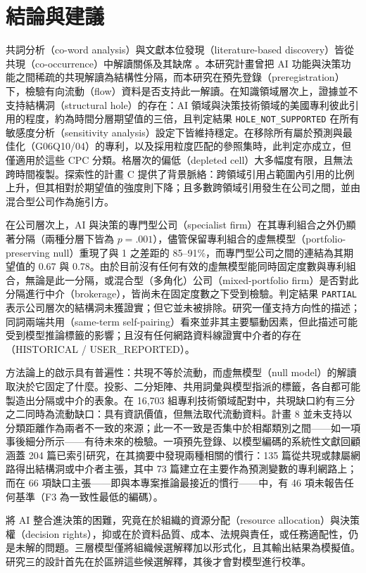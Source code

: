
\chapter{結論與建議}
\label{zh:sec:conclusion}

共詞分析（co-word analysis）與文獻本位發現（literature-based discovery）皆從共現（co-occurrence）中解讀關係及其缺席 \citep{callon1983translations,swanson1986fish}。本研究計畫曾把 AI 功能與決策功能之間稀疏的共現解讀為結構性分隔，而本研究在預先登錄（preregistration）下，檢驗有向流動（flow）資料是否支持此一解讀。在知識領域層次上，證據並不支持結構洞（structural hole）的存在：AI 領域與決策技術領域的美國專利彼此引用的程度，約為時間分層期望值的三倍，且判定結果 \texttt{HOLE\_\allowbreak NOT\_\allowbreak SUPPORTED} 在所有敏感度分析（sensitivity analysis）設定下皆維持穩定。在移除所有屬於預測與最佳化（G06Q10/04）的專利，以及採用粒度匹配的參照集時，此判定亦成立，但僅適用於這些 CPC 分類。格層次的偏低（depleted cell）大多幅度有限，且無法跨時間複製。探索性的計畫 C 提供了背景脈絡：跨領域引用占範圍內引用的比例上升，但其相對於期望值的強度則下降；且多數跨領域引用發生在公司之間，並由混合型公司作為施引方。

在公司層次上，AI 與決策的專門型公司（specialist firm）在其專利組合之外仍顯著分隔（兩種分層下皆為 $p=.001$），儘管保留專利組合的虛無模型（portfolio-preserving null）重現了與 1 之差距的 85--91\%，而專門型公司之間的連結為其期望值的 0.67 與 0.78。由於目前沒有任何有效的虛無模型能同時固定度數與專利組合，無論是此一分隔，或混合型（多角化）公司（mixed-portfolio firm）是否對此分隔進行中介（brokerage），皆尚未在固定度數之下受到檢驗。判定結果 \texttt{PARTIAL} 表示公司層次的結構洞未獲證實；但它並未被排除。研究一僅支持方向性的描述；同詞兩端共用（same-term self-pairing）看來並非其主要驅動因素，但此描述可能受到模型推論標籤的影響；且沒有任何網路資料線證實中介者的存在（HISTORICAL / USER\_REPORTED）。

方法論上的啟示具有普遍性：共現不等於流動，而虛無模型（null model）的解讀取決於它固定了什麼。投影、二分矩陣、共用詞彙與模型指派的標籤，各自都可能製造出分隔或中介的表象。在 16,703 組專利技術領域配對中，共現缺口約有三分之二同時為流動缺口：具有資訊價值，但無法取代流動資料。計畫 8 並未支持以分類距離作為兩者不一致的來源；此一不一致是否集中於相鄰類別之間——如一項事後細分所示——有待未來的檢驗。一項預先登錄、以模型編碼的系統性文獻回顧涵蓋 204 篇已索引研究，在其摘要中發現兩種相關的慣行：135 篇從共現或隸屬網路得出結構洞或中介者主張，其中 73 篇建立在主要作為預測變數的專利網路上；而在 66 項缺口主張——即與本專案推論最接近的慣行——中，有 46 項未報告任何基準（F3 為一致性最低的編碼）。

將 AI 整合進決策的困難，究竟在於組織的資源分配（resource allocation）與決策權（decision rights），抑或在於資料品質、成本、法規與責任，或任務適配性，仍是未解的問題。三層模型僅將組織候選解釋加以形式化，且其輸出結果為模擬值。研究三的設計首先在於區辨這些候選解釋，其後才會對模型進行校準。
